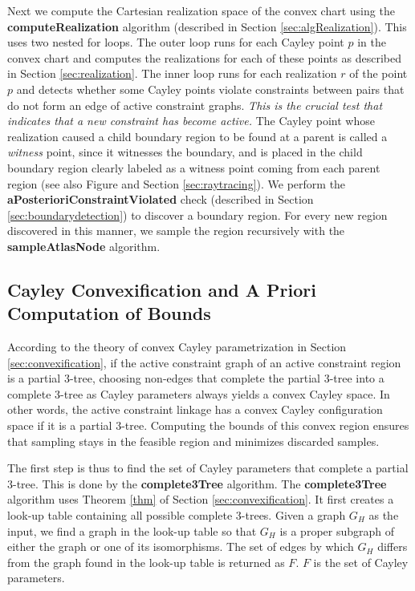 Next we compute the Cartesian realization space of the convex chart using the
\textbf{computeRealization} algorithm (described in Section
\ref{sec:algRealization}). This uses two nested for loops. The outer loop runs
for each Cayley point $p$ in the convex chart and computes the realizations for
each of these points as described in Section \ref{sec:realization}. The inner
loop runs for each realization $r$ of the point $p$ and detects whether some
Cayley points violate constraints between pairs that do not form an edge of
active constraint graphs.  {\sl This is the crucial test that indicates that a
new constraint has become active.} The Cayley point whose realization caused a
child boundary region to be found at a parent is called a \emph{witness} point,
since it witnesses the boundary, and is placed in the child boundary region
clearly labeled as a witness point coming from each parent region (see also
Figure
 and Section \ref{sec:raytracing}). We perform the
\textbf{aPosterioriConstraintViolated} check (described in Section
\ref{sec:boundarydetection}) to discover a boundary region. For every new
region discovered in this manner, we sample the region recursively with the
\textbf{sampleAtlasNode} algorithm.


\subsection{Cayley Convexification and A Priori Computation of Bounds}
\label{sec:tetrahedralbounds}
According to the theory of convex Cayley parametrization in Section
\ref{sec:convexification}, if the active constraint graph of an active
constraint region is a partial 3-tree, choosing non-edges that complete the
partial 3-tree into a complete 3-tree as Cayley parameters always yields a
convex Cayley space. In other words, the active constraint linkage has a convex
Cayley configuration space if it is a partial 3-tree.  Computing the bounds of
this convex region ensures that sampling stays in the feasible region and
minimizes discarded samples.

The first step is thus to find the set of Cayley parameters that complete a
partial 3-tree. This is done by the \textbf{complete3Tree} algorithm. The
\textbf{complete3Tree} algorithm uses Theorem \ref{thm} of Section
\ref{sec:convexification}. It first creates a look-up table containing all
possible complete 3-trees. Given a graph $G_H$ as the input, we find a graph in
the look-up table so that $G_H$ is a proper subgraph of either the graph or one
of its isomorphisms. The set of edges by which $G_H$ differs from the graph
found in the look-up table is returned as $F$. $F$ is the set of Cayley
parameters.

